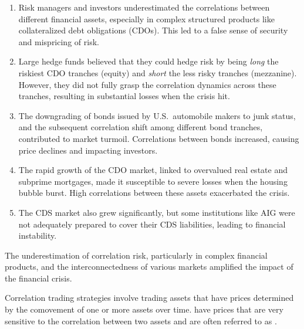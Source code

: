 \begin{enumerate}
\item {} Risk managers and investors underestimated the
      correlations between different financial assets, especially in complex structured products
      like collateralized debt obligations (CDOs). This led to a false sense of security and
      mispricing of risk.
\item {} Large hedge funds believed that they could hedge risk by
      being \textit{long} the riskiest CDO tranches (equity) and \textit{short} the less risky
      tranches (mezzanine). However, they did not fully grasp the correlation dynamics across
      these tranches, resulting in substantial losses when the crisis hit.
\item {} The downgrading of bonds issued by U.S.\ automobile makers to
      junk status, and the subsequent correlation shift among different bond tranches,
      contributed to market turmoil. Correlations between bonds increased, causing price
      declines and impacting investors.
\item {} The rapid growth of the CDO market, linked to overvalued real
      estate and subprime mortgages, made it susceptible to severe losses when the housing
      bubble burst. High correlations between these assets exacerbated the crisis.
\item {} The CDS market also grew significantly, but some
      institutions like AIG were not adequately prepared to cover their CDS liabilities, leading
      to financial instability.
\end{enumerate}

\begin{mrkeybox}[title={Remember}]
The underestimation of correlation risk, particularly in complex financial products, and the
interconnectedness of various markets amplified the impact of the financial crisis.
\end{mrkeybox}


Correlation trading strategies involve trading assets that have prices determined by the
comovement of one or more assets over time.  have prices that are very
sensitive to the correlation between two assets and are often referred to as .

